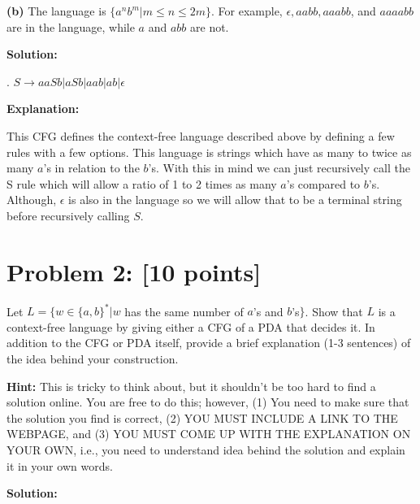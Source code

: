 \documentclass[11pt, letterpaper]{article}
\begin{document}
\noindent \textbf{(b)} The language is $\{a^nb^m | m \leq n \leq 2m\}$. For example, $\epsilon, aabb, aaabb$, and $aaaabb$ are in the language, while $a$ and $abb$ are not.

\vspace{5mm}

\noindent\textbf{Solution:}
 
\vspace {5mm}

. $S \rightarrow aaSb|aSb|aab|ab|\epsilon$

\vspace {5mm}

\noindent \textbf{Explanation:}

\vspace{5mm}

\noindent This CFG defines the context-free language described above by defining a few rules with a few options. This language is strings which have as many to twice as many $a$'s in relation to the $b$'s. With this in mind we can just recursively call the S rule which will allow a ratio of 1 to 2 times as many $a$'s compared to $b$'s. Although, $\epsilon$ is also in the language so we will allow that to be a terminal string before recursively calling $S$.

\newpage

\section*{Problem 2: [10 points]}

\noindent Let $L = \{w \in \{a, b\}^* | w$ has the same number of $a$'s and $b$'s$\}$. Show that $L$ is a context-free language by giving either a CFG of a PDA that decides it. In addition to the CFG or PDA itself, provide a brief explanation (1-3 sentences) of the idea behind your construction.

\vspace{5mm}

\noindent \textbf{Hint:} This is tricky to think about, but it shouldn't be too hard to find a solution online. You are free to do this; however, (1) You need to make sure that the solution you find is correct, (2) YOU MUST INCLUDE A LINK TO THE WEBPAGE, and (3) YOU MUST COME UP WITH THE EXPLANATION ON YOUR OWN, i.e., you need to understand idea behind the solution and explain it in your own words.

\vspace{5mm}

\noindent\textbf{Solution:}

\vspace{5mm}
\end{document}
